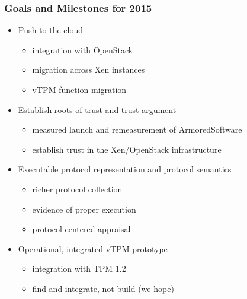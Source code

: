 \documentclass{beamer}
\begin{document}
\begin{frame}
  \frametitle{Goals and Milestones for 2015}

  \begin{itemize}
  \item Push to the cloud
    \begin{itemize}
    \item integration with OpenStack
    \item migration across Xen instances
    \item vTPM function migration
    \end{itemize}
  \item Establish roots-of-trust and trust argument
    \begin{itemize}
    \item measured launch and remeasurement of ArmoredSoftware
    \item establish trust in the Xen/OpenStack infrastructure
    \end{itemize}
  \item Executable protocol representation and protocol semantics
    \begin{itemize}
    \item richer protocol collection
    \item evidence of proper execution
    \item protocol-centered appraisal
    \end{itemize}
  \item Operational, integrated vTPM prototype
    \begin{itemize}
    \item integration with TPM 1.2
    \item find and integrate, not build (we hope)
    \end{itemize}
  \end{itemize}
\end{frame}
\end{document}
